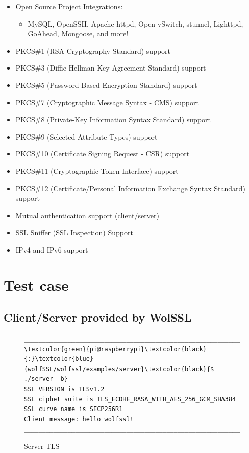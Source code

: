 \documentclass[a4paper,12pt]{article}
\begin{document}
\begin{itemize}
\item Open Source Project Integrations:
\begin{itemize}
\item MySQL, OpenSSH, Apache httpd, Open vSwitch, stunnel, Lighttpd, GoAhead, Mongoose, and more!
\end{itemize}
\item PKCS\#1 (RSA Cryptography Standard) support
\item PKCS\#3 (Diffie-Hellman Key Agreement Standard) support
\item PKCS\#5 (Password-Based Encryption Standard) support
\item PKCS\#7 (Cryptographic Message Syntax - CMS) support
\item PKCS\#8 (Private-Key Information Syntax Standard) support
\item PKCS\#9 (Selected Attribute Types) support
\item PKCS\#10 (Certificate Signing Request - CSR) support
\item PKCS\#11 (Cryptographic Token Interface) support
\item PKCS\#12 (Certificate/Personal Information Exchange Syntax Standard) support
\item Mutual authentication support (client/server)
\item SSL Sniffer (SSL Inspection) Support
\item IPv4 and IPv6 support
\end{itemize}


\section{Test case}
\subsection{Client/Server provided by WolSSL}

\begin{figure}[H]
\begin{Verbatim}[commandchars=\\\{\}]
______________________________________________________________
\textcolor{green}{pi@raspberrypi}\textcolor{black}{:}\textcolor{blue}{wolfSSL/wolfssl/examples/server}\textcolor{black}{$ ./server -b}
SSL VERSION is TLSv1.2
SSL ciphet suite is TLS_ECDHE_RASA_WITH_AES_256_GCM_SHA384
SSL curve name is SECP256R1
Client message: hello wolfssl!
______________________________________________________________
\end{Verbatim}
\caption{Server TLS}
\end{figure}
\end{document}
